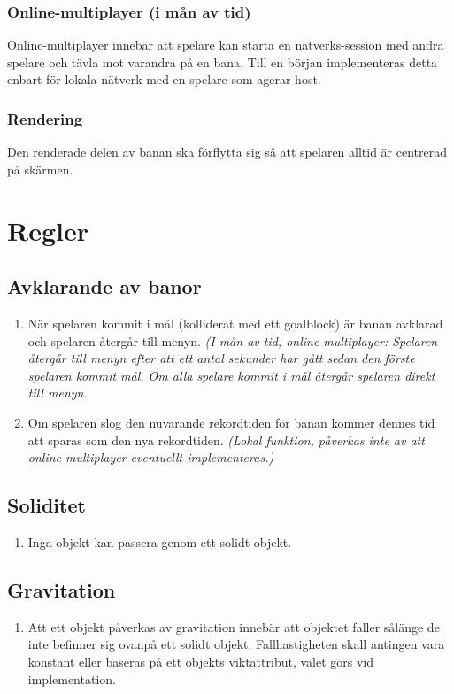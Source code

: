 \documentclass{TDP003mall}
\begin{document}
\subsubsection{Online-multiplayer (i mån av tid)}
Online-multiplayer innebär att spelare kan starta en nätverks-session med andra spelare och tävla mot varandra på en bana. Till en början implementeras detta enbart för lokala nätverk med en spelare som agerar host. 

\subsubsection{Rendering}
Den renderade delen av banan ska förflytta sig så att spelaren alltid är centrerad på skärmen.

\newpage

\section{Regler}

\subsection{Avklarande av banor}
\begin{enumerate}
\item När spelaren kommit i mål (kolliderat med ett goalblock) är banan avklarad och spelaren återgår till menyn. \textit{(I mån av tid, online-multiplayer: Spelaren återgår till menyn efter att ett antal sekunder har gått sedan den förste spelaren kommit mål. Om alla spelare kommit i mål återgår spelaren direkt till menyn.}
\item Om spelaren slog den nuvarande rekordtiden för banan kommer dennes tid att sparas som den nya rekordtiden. \textit{(Lokal funktion, påverkas inte av att online-multiplayer eventuellt implementeras.)}
\end{enumerate}

\subsection{Soliditet}
\begin{enumerate}
\item Inga objekt kan passera genom ett solidt objekt.
\end{enumerate}

\subsection{Gravitation}
\begin{enumerate}
\item Att ett objekt påverkas av gravitation innebär att objektet faller sålänge de inte befinner sig ovanpå ett solidt objekt. Fallhastigheten skall antingen vara konstant eller baseras på ett objekts viktattribut, valet görs vid implementation.
\end{enumerate}
\end{document}
